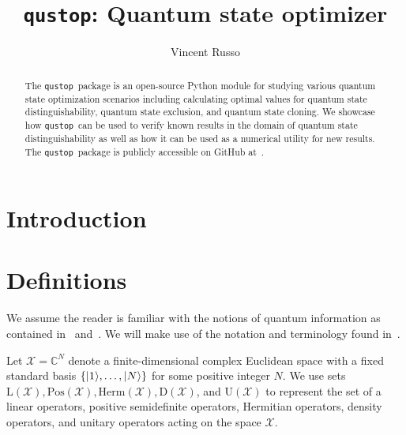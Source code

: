 \documentclass[11pt]{article}
\theoremstyle{definition}
\newcommand{\microspace}{\mspace{0.5mu}}
\newcommand{\ket}[1]{
  \lvert\microspace #1 \microspace \rangle}
\newcommand{\setft}[1]{\mathrm{#1}}
\newcommand{\Density}{\setft{D}}
\newcommand{\Pos}{\setft{Pos}}
\newcommand{\Unitary}{\setft{U}}
\newcommand{\Herm}{\setft{Herm}}
\newcommand{\Lin}{\setft{L}}
\newcommand{\complex}{\mathbb{C}}
\newcommand{\qustop}{\texttt{qustop}}
\newcommand{\X}{\mathcal{X}}
\begin{document}
\title{\LARGE\bf \qustop: Quantum state optimizer}

\author[1]{Vincent Russo}
  
\renewcommand\Affilfont{\normalsize\itshape}
\renewcommand\Authfont{\large}
\setlength{\affilsep}{6mm}
\renewcommand\Authand{\rule{10mm}{0mm}}

\maketitle

\begin{abstract}
    The \qustop\ package is an open-source Python module for studying various
    quantum state optimization scenarios including calculating optimal values
    for quantum state distinguishability, quantum state exclusion, and quantum
    state cloning. We showcase how \qustop \ can be used to verify known results
    in the domain of quantum state distinguishability as well as how it can be
    used as a numerical utility for new results. The \qustop \ package is
    publicly accessible on GitHub at~\cite{}.
\end{abstract}

\section{Introduction}
\label{sec:intro}

\section{Definitions}
\label{sec:definitions}

We assume the reader is familiar with the notions of quantum information as
contained in~\cite{nielsen2002quantum} and~\cite{wilde2013quantum}. We will
make use of the notation and terminology found in~\cite{watrous2018theory}.


Let $\X = \complex^N$ denote a finite-dimensional complex Euclidean space with
a fixed standard basis $\{\ket{1}, \ldots, \ket{N} \}$ for some positive
integer $N$. We use sets $\Lin(\X), \Pos(\X), \Herm(\X), \Density(\X)$, and
$\Unitary(\X)$ to represent the set of a linear operators, positive
semidefinite operators, Hermitian operators, density operators, and unitary
operators acting on the space $\X$.
\end{document}
